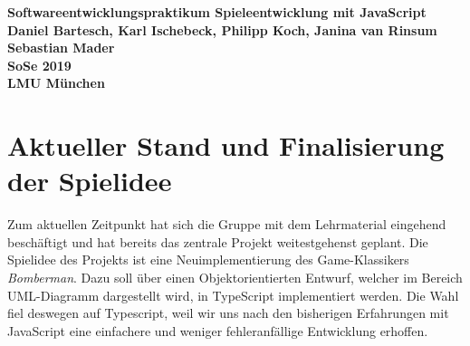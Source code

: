 \documentclass[10pt, a4paper]{report}
\begin{document}
		\begin{center}
		\huge \textbf{Softwareentwicklungspraktikum Spieleentwicklung mit JavaScript}\\
		\vspace{1cm}
		\small 
		\textbf{Daniel Bartesch, Karl Ischebeck, Philipp Koch, Janina van Rinsum}	\\
		\textbf{Sebastian Mader}									\\
		\textbf{SoSe 2019}											\\
		\textbf{LMU München}
		\vspace{1cm}
	\end{center}
	\section{Aktueller Stand und Finalisierung der Spielidee}
	Zum aktuellen Zeitpunkt hat sich die Gruppe mit dem Lehrmaterial eingehend beschäftigt und hat bereits das zentrale Projekt weitestgehenst geplant. Die Spielidee des Projekts ist eine Neuimplementierung des Game-Klassikers \textit{Bomberman}. Dazu soll über einen Objektorientierten Entwurf, welcher im Bereich UML-Diagramm dargestellt wird, in TypeScript implementiert werden. Die Wahl fiel deswegen auf Typescript, weil wir uns nach den bisherigen Erfahrungen mit JavaScript eine einfachere und weniger fehleranfällige Entwicklung erhoffen. \\
\end{document}
